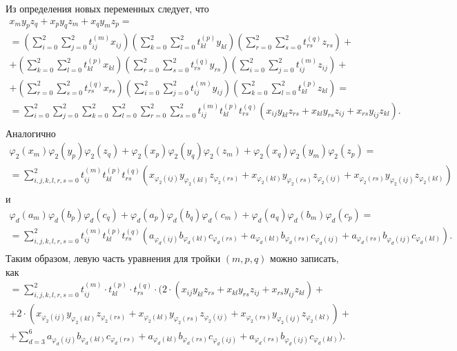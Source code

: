 \documentclass[12pt]{article}
\begin{document}
    Из определения новых переменных следует, что
    \begin{gather*}
        x_{m} y_{p} z_{q}+x_{p} y_{q} z_{m}+x_{q} y_{m} z_{p}=\\
        =(\sum_{i=0}^2 \sum_{j=0}^2 t_{ij}^{(m)} x_{ij}) (\sum_{k=0}^2 \sum_{l=0}^2 t_{kl}^{(p)} y_{kl})  (\sum_{r=0}^2 \sum_{s=0}^2 t_{rs}^{(q)} z_{rs}) +\\
        +(\sum_{k=0}^2 \sum_{l=0}^2 t_{kl}^{(p)} x_{kl})  (\sum_{r=0}^2 \sum_{s=0}^2 t_{rs}^{(q)} y_{rs}) (\sum_{i=0}^2 \sum_{j=0}^2 t_{ij}^{(m)} z_{ij}) +\\
        + (\sum_{r=0}^2 \sum_{s=0}^2 t_{rs}^{(q)} x_{rs}) (\sum_{i=0}^2 \sum_{j=0}^2 t_{ij}^{(m)} y_{ij}) (\sum_{k=0}^2 \sum_{l=0}^2 t_{kl}^{(p)} z_{kl})  =\\
        =\sum_{i=0}^2 \sum_{j=0}^2 \sum_{k=0}^2 \sum_{l=0}^2 \sum_{r=0}^2 \sum_{s=0}^2 t_{ij}^{(m)} t_{kl}^{(p)} t_{rs}^{(q)} (x_{ij}y_{kl}z_{rs} + x_{kl}y_{rs}z_{ij} + x_{rs}y_{ij}z_{kl}).\\
    \end{gather*}
    Аналогично
    \begin{gather*}
        \varphi_2 (x_m) \varphi_2 (y_p) \varphi_2 (z_q)+ \varphi_2 (x_p) \varphi_2 (y_q) \varphi_2 (z_m)+ \varphi_2 (x_q) \varphi_2 (y_m) \varphi_2 (z_p)=\\
        =\sum_{i,j,k,l,r,s=0}^2 t_{ij}^{(m)} t_{kl}^{(p)} t_{rs}^{(q)} (x_{\varphi_2 (ij)}y_{\varphi_2 (kl)}z_{\varphi_2 (rs)} + x_{\varphi_2 (kl)}y_{\varphi_2 (rs)}z_{\varphi_2 (ij)} + x_{\varphi_2 (rs)}y_{\varphi_2 (ij)}z_{\varphi_2 (kl)})\\
    \end{gather*}
    и
    \begin{gather*}
        \varphi_d (a_m) \varphi_d (b_p) \varphi_d (c_q)+ \varphi_d (a_p) \varphi_d (b_q) \varphi_d (c_m)+ \varphi_d (a_q) \varphi_d (b_m) \varphi_d (c_p)=\\
        =\sum_{i,j,k,l,r,s=0}^2 t_{ij}^{(m)} t_{kl}^{(p)} t_{rs}^{(q)} (a_{\varphi_d (ij)}b_{\varphi_d (kl)}c_{\varphi_d (rs)} + a_{\varphi_d (kl)}b_{\varphi_d (rs)}c_{\varphi_d (ij)} + a_{\varphi_d (rs)}b_{\varphi_d (ij)}c_{\varphi_d (kl)}).\\
    \end{gather*}
    Таким образом, левую часть уравнения для тройки $(m, p, q)$ можно записать, как
    \begin{gather*}
        =\sum_{i,j,k,l,r,s=0}^2 t_{ij}^{(m)}\cdot t_{kl}^{(p)}\cdot t_{rs}^{(q)}\cdot (2\cdot (x_{ij}y_{kl}z_{rs} + x_{kl}y_{rs}z_{ij} + x_{rs}y_{ij}z_{kl})+\\
        + 2\cdot (x_{\varphi_2 (ij)}y_{\varphi_2 (kl)}z_{\varphi_2 (rs)} +
        x_{\varphi_2 (kl)}y_{\varphi_2 (rs)}z_{\varphi_2 (ij)} + x_{\varphi_2 (rs)}y_{\varphi_2 (ij)}z_{\varphi_2 (kl)}) +\\
        + \sum_{d=3}^{6}a_{\varphi_d (ij)}b_{\varphi_d (kl)}c_{\varphi_d (rs)} + a_{\varphi_d (kl)}b_{\varphi_d (rs)}c_{\varphi_d (ij)} + a_{\varphi_d (rs)}b_{\varphi_d (ij)}c_{\varphi_d (kl)}).\\
    \end{gather*}
\end{document}
